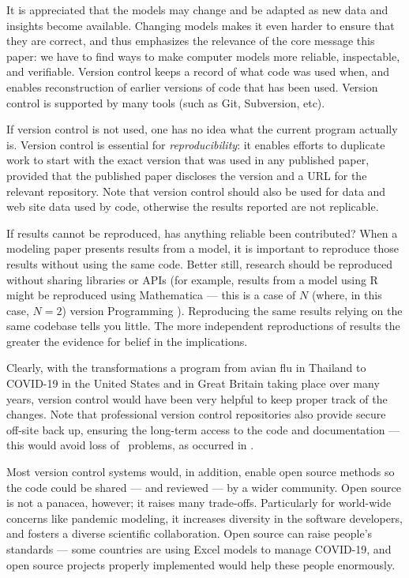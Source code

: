 \documentclass[10pt,a4paper]{article}
\begin{document}
It is appreciated that the models may change and be adapted as new data and insights become available. Changing models makes it even harder to ensure that they are correct, and thus emphasizes the relevance of the core message this paper: we have to find ways to make computer models more reliable, inspectable, and verifiable. Version control keeps a record of what code was used when, and enables reconstruction of earlier versions of code that has been used. Version control is supported by many tools (such as Git, Subversion, etc). 

If version control is not used, one has no idea what the current program actually is. {Version control is essential for \emph{reproducibility\/}: \cite{basic-reproducibilty,reproducibility} it enables efforts to duplicate work to start with the exact version that was used in any published paper, provided that the published paper discloses the version and a URL for the relevant repository. Note that version control should also be used for data and web site data used by code, otherwise the results reported are not replicable.}

{If results cannot be reproduced, has anything reliable been contributed? When a modeling paper presents results from a model, it is important to reproduce those results without using the same code. Better still, research should be reproduced without sharing libraries or APIs (for example, results from a model using R might be reproduced using Mathematica --- this is a case of $N$ (where, in this case, $N=2$) version Programming \cite{NVP}). Reproducing the same results relying on the same codebase tells you little. The more independent reproductions of results the greater the evidence for belief in the implications.}

Clearly, with the transformations a program from avian flu in Thailand \cite{avianFluModel} to COVID-19 in the United States and in Great Britain \cite{ICmodel} taking place over many years, version control would have been very helpful to keep proper track of the changes. Note that professional version control repositories also provide secure off-site back up, ensuring the long-term access to the code and documentation --- this would avoid loss of \supplement\ problems, as occurred in \cite{flu-model}.

Most version control systems would, in addition, enable open source methods so the code could be shared --- and reviewed --- by a wider community. Open source is not a panacea, however; it raises many trade-offs. Particularly for world-wide concerns like pandemic modeling, it increases diversity in the software developers, and fosters a diverse scientific collaboration. Open source can raise people's standards --- some countries \cite{excel1,excel2} are using Excel models to manage COVID-19, and open source projects properly implemented would help these people enormously. 
\end{document}
